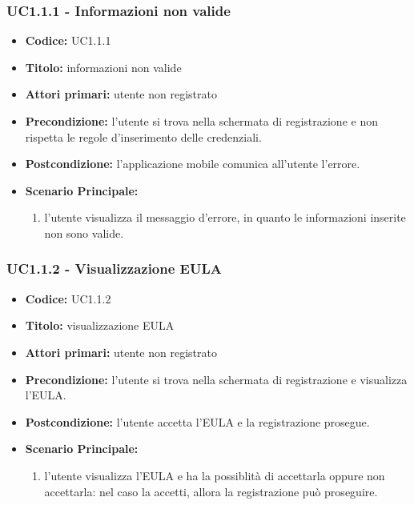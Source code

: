 \documentclass[../analisi-dei-requisiti]{subfiles}
\begin{document}
\subsubsection{UC1.1.1 - Informazioni non valide}
\label{sub:uc1.1.1utente}
\begin{itemize}
  \item \textbf{Codice:} UC1.1.1
  \item \textbf{Titolo:} informazioni non valide
  \item \textbf{Attori primari:} utente non registrato
  \item \textbf{Precondizione:} l'utente si trova nella schermata di registrazione e non rispetta le regole d'inserimento delle credenziali.
  \item \textbf{Postcondizione:} l'applicazione mobile comunica all'utente l'errore.
  \item \textbf{Scenario Principale:} 
  \begin{enumerate}
    \item l'utente visualizza il messaggio d'errore, in quanto le informazioni inserite non sono valide.
  \end{enumerate}
\end{itemize}

\subsubsection{UC1.1.2 - Visualizzazione EULA}
\label{sub:uc1.1.2utente}
\begin{itemize}
  \item \textbf{Codice:} UC1.1.2
  \item \textbf{Titolo:} visualizzazione EULA
  \item \textbf{Attori primari:} utente non registrato
  \item \textbf{Precondizione:} l'utente si trova nella schermata di registrazione e visualizza l'EULA\@.
  \item \textbf{Postcondizione:} l'utente accetta l'EULA e la registrazione prosegue.
  \item \textbf{Scenario Principale:}
  \begin{enumerate}
    \item l'utente visualizza l'EULA e ha la possiblità di accettarla oppure non accettarla: nel caso la accetti, allora la registrazione può proseguire.
  \end{enumerate}
\end{itemize}
\end{document}
